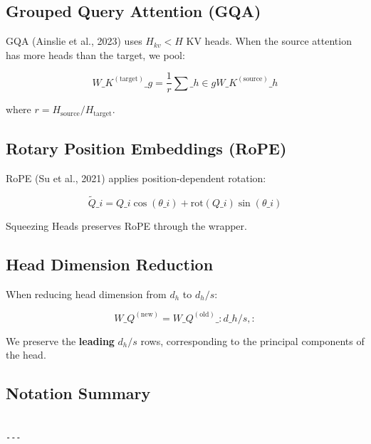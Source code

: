 \subsection{Grouped Query Attention (GQA)}

GQA (Ainslie et al., 2023) uses $H_{kv} < H$ KV heads. When the source 
attention has more heads than the target, we pool:

\[
{W\_K^{(\text{target})}}\_g = \frac{1}{r} \sum\_{h \in g} {W\_K^{(\text{source})}}\_h
\]

where $r = H_\text{source} / H_\text{target}$.

\subsection{Rotary Position Embeddings (RoPE)}

RoPE (Su et al., 2021) applies position-dependent rotation:

\[
\tilde{Q}\_i = Q\_i \cos(\theta\_i) + \text{rot}(Q\_i) \sin(\theta\_i)
\]

Squeezing Heads preserves RoPE through the wrapper.

\subsection{Head Dimension Reduction}

When reducing head dimension from $d_h$ to $d_h / s$:

\[
W\_Q^{(\text{new})} = {W\_Q^{(\text{old})}}\_{:d\_h/s, :}
\]

We preserve the \textbf{leading} $d_h / s$ rows, corresponding to the principal 
components of the head.

\subsection{Notation Summary}

\begin{lstlisting}

---
\end{lstlisting}